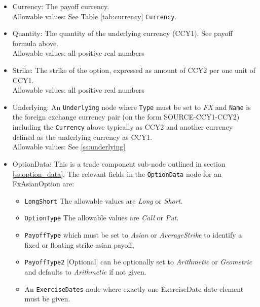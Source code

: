 \begin{itemize}
	\item Currency: The payoff currency. \\  %
	Allowable values: See Table \ref{tab:currency} \lstinline!Currency!.
	\item Quantity: The quantity of the underlying currency (CCY1). See payoff formula above.  \\
	Allowable values: all positive real numbers
	\item Strike: The strike of the option, expressed as amount of CCY2 per one unit of CCY1. \\
	Allowable values: all positive real numbers
	\item Underlying: An \lstinline!Underlying! node where \lstinline!Type! must be set to \emph{FX} and \lstinline!Name! is the foreign exchange currency pair (on the form SOURCE-CCY1-CCY2) including the \lstinline!Currency! above typically as CCY2 and another currency defined as the underlying currency as CCY1.   \\
	Allowable values:  See \ref{ss:underlying}
	
	\item OptionData:  This is a trade component sub-node outlined in section \ref{ss:option_data}.  The relevant fields in the \lstinline!OptionData! node for an FxAsianOption are:
	
	\begin{itemize}
	
	\item \lstinline!LongShort! The allowable values are \emph{Long} or \emph{Short}.
	
	\item \lstinline!OptionType! The allowable values are \emph{Call} or \emph{Put}. 
	
	 \item \lstinline!PayoffType! which must be set to \emph{Asian} or \emph{AverageStrike} to
	identify a fixed or floating strike asian payoff, 
	
	 \item \lstinline!PayoffType2! [Optional] can be optionally set to \emph{Arithmetic} or \emph{Geometric} and defaults to \emph{Arithmetic} if not given. 
	
	\item An \lstinline!ExerciseDates! node where exactly one ExerciseDate date element must be given. 
	

\end{itemize}
\end{itemize}
